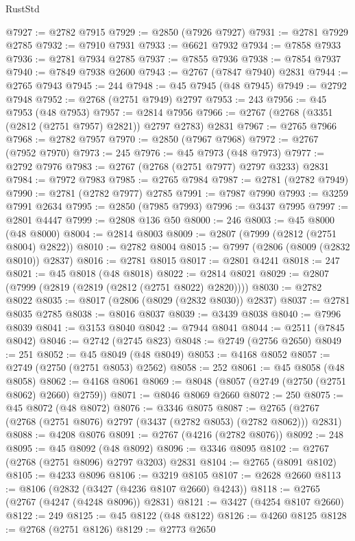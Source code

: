 \begin{lexlean}{RustStd}
\begin{coremodule}
@7927 := @2782 @7915
@7929 := @2850 (@7926 @7927)
@7931 := @2781 @7929 @2785
@7932 := @7910 @7931
@7933 := @6621 @7932
@7934 := @7858 @7933
@7936 := @2781 @7934 @2785
@7937 := @7855 @7936
@7938 := @7854 @7937
@7940 := @7849 @7938 @2600
@7943 := @2767 (@7847 @7940) @2831
@7944 := @2765 @7943
@7945 := 244
@7948 := @45 @7945 (@48 @7945)
@7949 := @2792 @7948
@7952 := @2768 (@2751 @7949) @2797
@7953 := 243
@7956 := @45 @7953 (@48 @7953)
@7957 := @2814 @7956
@7966 := @2767 (@2768 (@3351 (@2812 (@2751 @7957) @2821)) @2797 @2783) @2831
@7967 := @2765 @7966
@7968 := @2782 @7957
@7970 := @2850 (@7967 @7968)
@7972 := @2767 (@7952 @7970)
@7973 := 245
@7976 := @45 @7973 (@48 @7973)
@7977 := @2792 @7976
@7983 := @2767 (@2768 (@2751 @7977) @2797 @3233) @2831
@7984 := @7972 @7983
@7985 := @2765 @7984
@7987 := @2781 (@2782 @7949)
@7990 := @2781 (@2782 @7977) @2785
@7991 := @7987 @7990
@7993 := @3259 @7991 @2634
@7995 := @2850 (@7985 @7993)
@7996 := @3437 @7995
@7997 := @2801 @4447
@7999 := @2808 @136 @50
@8000 := 246
@8003 := @45 @8000 (@48 @8000)
@8004 := @2814 @8003
@8009 := @2807 (@7999 (@2812 (@2751 @8004) @2822))
@8010 := @2782 @8004
@8015 := @7997 (@2806 (@8009 (@2832 @8010)) @2837)
@8016 := @2781 @8015
@8017 := @2801 @4241
@8018 := 247
@8021 := @45 @8018 (@48 @8018)
@8022 := @2814 @8021
@8029 := @2807 (@7999 (@2819 (@2819 (@2812 (@2751 @8022) @2820))))
@8030 := @2782 @8022
@8035 := @8017 (@2806 (@8029 (@2832 @8030)) @2837)
@8037 := @2781 @8035 @2785
@8038 := @8016 @8037
@8039 := @3439 @8038
@8040 := @7996 @8039
@8041 := @3153 @8040
@8042 := @7944 @8041
@8044 := @2511 (@7845 @8042)
@8046 := @2742 (@2745 @823)
@8048 := @2749 (@2756 @2650)
@8049 := 251
@8052 := @45 @8049 (@48 @8049)
@8053 := @4168 @8052
@8057 := @2749 (@2750 (@2751 @8053) @2562)
@8058 := 252
@8061 := @45 @8058 (@48 @8058)
@8062 := @4168 @8061
@8069 := @8048 (@8057 (@2749 (@2750 (@2751 @8062) @2660) @2759))
@8071 := @8046 @8069 @2660
@8072 := 250
@8075 := @45 @8072 (@48 @8072)
@8076 := @3346 @8075
@8087 := @2765 (@2767 (@2768 (@2751 @8076) @2797 (@3437 (@2782 @8053) (@2782 @8062))) @2831)
@8088 := @4208 @8076
@8091 := @2767 (@4216 (@2782 @8076))
@8092 := 248
@8095 := @45 @8092 (@48 @8092)
@8096 := @3346 @8095
@8102 := @2767 (@2768 (@2751 @8096) @2797 @3203) @2831
@8104 := @2765 (@8091 @8102)
@8105 := @4233 @8096
@8106 := @3219 @8105
@8107 := @2628 @2660
@8113 := @8106 (@2832 (@3427 (@4236 @8107 @2660) @4243))
@8118 := @2765 (@2767 (@4247 (@4248 @8096)) @2831)
@8121 := @3427 (@4254 @8107 @2660)
@8122 := 249
@8125 := @45 @8122 (@48 @8122)
@8126 := @4260 @8125
@8128 := @2768 (@2751 @8126)
@8129 := @2773 @2650

\end{coremodule}
\end{lexlean}
